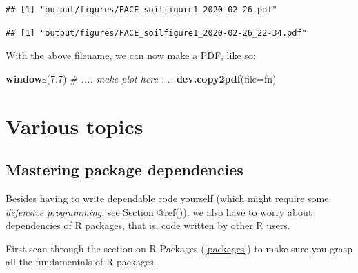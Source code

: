\documentclass[]{book}
\newenvironment{Shaded}{\begin{snugshade}}{\end{snugshade}}
\newcommand{\CommentTok}[1]{\textcolor[rgb]{0.56,0.35,0.01}{\textit{#1}}}
\newcommand{\DataTypeTok}[1]{\textcolor[rgb]{0.13,0.29,0.53}{#1}}
\newcommand{\DecValTok}[1]{\textcolor[rgb]{0.00,0.00,0.81}{#1}}
\newcommand{\KeywordTok}[1]{\textcolor[rgb]{0.13,0.29,0.53}{\textbf{#1}}}
\newcommand{\NormalTok}[1]{#1}
\newcommand{\StringTok}[1]{\textcolor[rgb]{0.31,0.60,0.02}{#1}}
\let\BeginKnitrBlock\begin \let\EndKnitrBlock\end
\begin{document}
\begin{verbatim}
## [1] "output/figures/FACE_soilfigure1_2020-02-26.pdf"
\end{verbatim}

\begin{Shaded}
\end{Shaded}

\begin{verbatim}
## [1] "output/figures/FACE_soilfigure1_2020-02-26_22-34.pdf"
\end{verbatim}

With the above filename, we can now make a PDF, like so:

\begin{Shaded}
\begin{Highlighting}[]
\KeywordTok{windows}\NormalTok{(}\DecValTok{7}\NormalTok{,}\DecValTok{7}\NormalTok{)}
\CommentTok{# .... make plot here ....}
\KeywordTok{dev.copy2pdf}\NormalTok{(}\DataTypeTok{file=}\NormalTok{fn)}
\end{Highlighting}
\end{Shaded}

\hypertarget{programmingtips}{%
\chapter{Various topics}\label{programmingtips}}

\hypertarget{mastering-package-dependencies}{%
\section{Mastering package dependencies}\label{mastering-package-dependencies}}

Besides having to write dependable code yourself (which might require some \emph{defensive programming}, see Section @ref()), we also have to worry about dependencies of R packages, that is, code written by other R users.

\BeginKnitrBlock{rmdreading}
First scan through the section on R Packages (\ref{packages}) to make sure you grasp all the fundamentals of R packages.
\EndKnitrBlock{rmdreading}
\end{document}
